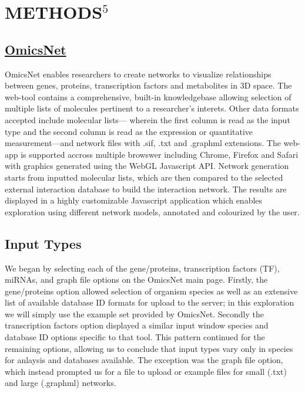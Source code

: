 \documentclass[letterpaper, 10 pt, conference]{ieeeconf}  %
\begin{document}
\section{METHODS$^5$}

\subsection{\href{https://www.omicsnet.ca/}{OmicsNet}}

OmicsNet enables researchers to create networks to visualize relationships between genes, proteins, transcription factors and metabolites in 3D space. The web-tool contains a comprehensive, built-in knowledgebase allowing selection of multiple lists of molecules pertinent to a researcher's interets. Other data formats accepted include molecular lists--- wherein the first column is read as the input type and the second column is read as the expression or quantitative measurement---and network files with .sif, .txt and .graphml extensions. The web-app is supported accross multiple browswer including Chrome, Firefox and Safari with graphics generated using the WebGL Javascript API. Network generation starts from inputted molecular lists, which are then compared to the selected external interaction database to build the interaction network. The results are displayed in a highly customizable Javascript application which enables exploration using different network models, annotated and colourized by the user.

\subsection{Input Types}

We began by selecting each of the gene/proteins, transcription factors (TF), miRNAs, and graph file options on the OmicsNet main page. Firstly, the gene/proteins option allowed selection of organism species as well as an extensive list of available database ID formats for upload to the server; in this exploration we will simply use the example set provided by OmicsNet. Secondly the transcription factors option displayed a similar input window species and database ID options specific to that tool. This pattern continued for the remaining options, allowing us to conclude that input types vary only in species for anlaysis and databases available. The exception was the graph file option, which instead prompted us for a file to upload or example files for small (.txt) and large (.graphml) networks. 
\end{document}
